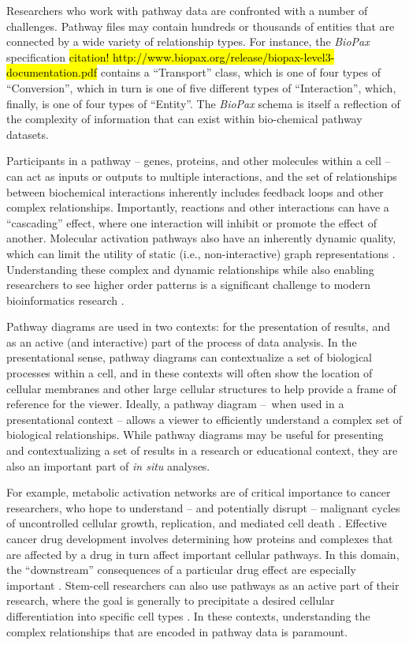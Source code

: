 Researchers who work with pathway data are confronted with a number of
challenges. Pathway files may contain hundreds or thousands of entities
that are connected by a wide variety of relationship types. For
instance, the \emph{BioPax} specification
\hl{citation! http://www.biopax.org/release/biopax-level3-documentation.pdf}
contains a ``Transport'' class, which is one of four types of
``Conversion'', which in turn is one of five different types of
``Interaction'', which, finally, is one of four types of ``Entity''. The
\emph{BioPax} schema is itself a reflection of the complexity of
information that can exist within bio-chemical pathway datasets.

Participants in a pathway -- genes, proteins, and other molecules within
a cell -- can act as inputs or outputs to multiple interactions, and the
set of relationships between biochemical interactions inherently
includes feedback loops and other complex relationships. Importantly,
reactions and other interactions can have a ``cascading'' effect, where
one interaction will inhibit or promote the effect of another. Molecular
activation pathways also have an inherently dynamic quality, which can
limit the utility of static (i.e., non-interactive) graph
representations \cite{kitano2002systems}. Understanding these complex
and dynamic relationships while also enabling researchers to see higher
order patterns is a significant challenge to modern bioinformatics
research \cite{saraiya2005visualizing}.

Pathway diagrams are used in two contexts: for the presentation of
results, and as an active (and interactive) part of the process of data
analysis. In the presentational sense, pathway diagrams can
contextualize a set of biological processes within a cell, and in these
contexts will often show the location of cellular membranes and other
large cellular structures to help provide a frame of reference for the
viewer. Ideally, a pathway diagram --~when used in a presentational
context -- allows a viewer to efficiently understand a complex set of
biological relationships. While pathway diagrams may be useful for
presenting and contextualizing a set of results in a research or
educational context, they are also an important part of \emph{in situ}
analyses.

For example, metabolic activation networks are of critical importance to
cancer researchers, who hope to understand -- and potentially disrupt --
malignant cycles of uncontrolled cellular growth, replication, and
mediated cell death \cite{cairns2011regulation}. Effective cancer drug
development involves determining how proteins and complexes that are
affected by a drug in turn affect important cellular pathways. In this
domain, the ``downstream'' consequences of a particular drug effect are
especially important \cite{luo2003targeting}. Stem-cell researchers can
also use pathways as an active part of their research, where the goal is
generally to precipitate a desired cellular differentiation into
specific cell types \cite{reya2001stem}. In these contexts,
understanding the complex relationships that are encoded in pathway data
is paramount.

